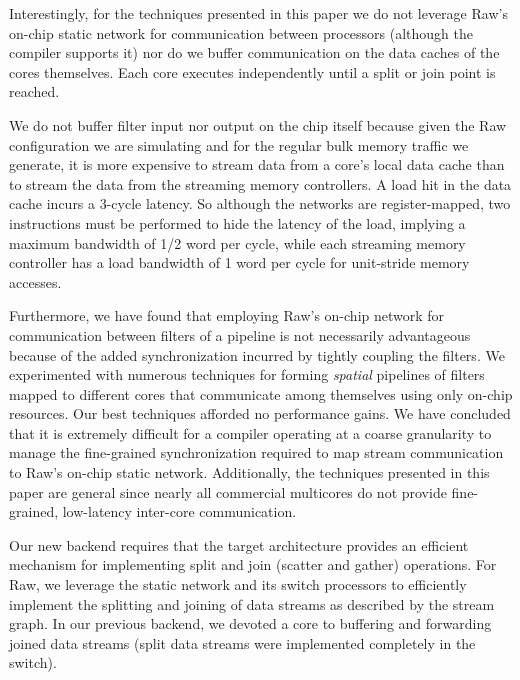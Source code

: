 Interestingly, for the techniques presented in this paper we do not
leverage Raw's on-chip static network for communication between
processors (although the compiler supports it) nor do we buffer
communication on the data caches of the cores themselves. Each core
executes independently until a split or join point is reached.

We do not buffer filter input nor output on the chip itself because
given the Raw configuration we are simulating and for the regular bulk
memory traffic we generate, it is more expensive to stream data from a
core's local data cache than to stream the data from the streaming
memory controllers. A load hit in the data cache incurs a 3-cycle
latency.  So although the networks are register-mapped, two
instructions must be performed to hide the latency of the load,
implying a maximum bandwidth of 1/2 word per cycle, while each
streaming memory controller has a load bandwidth of 1 word per cycle
for unit-stride memory accesses.

Furthermore, we have found that employing Raw's on-chip network for
communication between filters of a pipeline is not necessarily
advantageous because of the added synchronization incurred by tightly
coupling the filters.  We experimented with numerous techniques for
forming {\it spatial} pipelines of filters mapped to different cores
that communicate among themselves using only on-chip resources.  Our
best techniques afforded no performance gains.  We have concluded that
it is extremely difficult for a compiler operating at a coarse
granularity to manage the fine-grained synchronization required to map
stream communication to Raw's on-chip static network.  Additionally,
the techniques presented in this paper are general since nearly all
commercial multicores do not provide fine-grained, low-latency
inter-core communication.

Our new backend requires that the target architecture provides an
efficient mechanism for implementing split and join (scatter and
gather) operations.  For Raw, we leverage the static network and its
switch processors to efficiently implement the splitting and joining
of data streams as described by the stream graph.  In our previous
backend, we devoted a core to buffering and forwarding joined data
streams (split data streams were implemented completely in the
switch).


